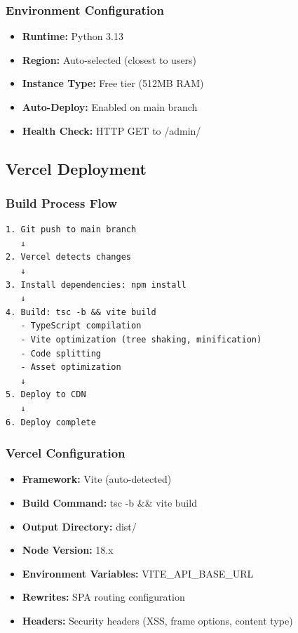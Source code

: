 \documentclass[11pt,a4paper]{article}
\begin{document}
\subsubsection{Environment Configuration}
\begin{itemize}[leftmargin=*]
    \item \textbf{Runtime:} Python 3.13
    \item \textbf{Region:} Auto-selected (closest to users)
    \item \textbf{Instance Type:} Free tier (512MB RAM)
    \item \textbf{Auto-Deploy:} Enabled on main branch
    \item \textbf{Health Check:} HTTP GET to /admin/
\end{itemize}

\subsection{Vercel Deployment}

\subsubsection{Build Process Flow}
\begin{verbatim}
1. Git push to main branch
   ↓
2. Vercel detects changes
   ↓
3. Install dependencies: npm install
   ↓
4. Build: tsc -b && vite build
   - TypeScript compilation
   - Vite optimization (tree shaking, minification)
   - Code splitting
   - Asset optimization
   ↓
5. Deploy to CDN
   ↓
6. Deploy complete
\end{verbatim}

\subsubsection{Vercel Configuration}
\begin{itemize}[leftmargin=*]
    \item \textbf{Framework:} Vite (auto-detected)
    \item \textbf{Build Command:} tsc -b \&\& vite build
    \item \textbf{Output Directory:} dist/
    \item \textbf{Node Version:} 18.x
    \item \textbf{Environment Variables:} VITE\_API\_BASE\_URL
    \item \textbf{Rewrites:} SPA routing configuration
    \item \textbf{Headers:} Security headers (XSS, frame options, content type)
\end{itemize}
\end{document}
